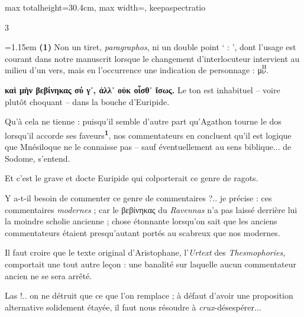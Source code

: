 \documentclass[11pt,twoside]{book}
\newcommand{\italique}[1]{\textit{#1}}
\newcommand{\auDessus}[2]{$\overset{\text{#2}}{\text{#1}}$}
\newcommand{\latin}[1]{\textit{#1}}
\newcommand{\allemand}[1]{\textit{#1}}
\newcommand{\marqueur}[1]{\textsuperscript{\color{rubricRed}\textbf{#1}}}
\begin{document}
\begin{adjustbox}{max totalheight=30.4cm, max width=\textwidth, keepaspectratio}
\begin{minipage}{\textwidth}
{\begin{multicols}{3}
\par\vspace{1.5pt}
\par\vspace{1.2pt}\par\nopagebreak\vspace{1pt}\noindent\hangindent=1.15em {\color{sepiaNote}\textbf{(1)}} Non un tiret, \italique{paragraphos}, ni un double point ` : ', dont l'usage est courant dans notre manuscrit lorsque le changement d'interlocuteur intervient au milieu d'un vers, mais en l'occurrence une indication de personnage : μ\auDessus{ν}{Η}.
\par\vspace{1.5pt}
 \textbf{καὶ μὴν βεβίνηκας σύ γ᾽, ἀλλ᾽ οὐκ οἶσθ᾽ ἴσως.} Le ton est inhabituel -- voire plutôt choquant -- dans la bouche d'Euripide.
\par\vspace{1.5pt}
\noindent Qu'à cela ne tienne : puisqu'il semble d'autre part qu'Agathon tourne le dos lorsqu'il accorde ses faveurs\marqueur{1}, nos commentateurs en concluent qu'il est logique que Mnésiloque ne le connaisse pas -- sauf éventuellement au sens biblique... de Sodome, s'entend.
\par\vspace{1.5pt}
\noindent Et c'est le grave et docte Euripide qui colporterait ce genre de ragots.
\par\vspace{1.5pt}
\noindent Y a-t-il besoin de commenter ce genre de commentaires ?.. je précise : ces commentaires \italique{modernes} ; car le βεβίνηκας du \italique{Ravennas} n'a pas laissé derrière lui la moindre scholie ancienne ; chose étonnante lorsqu'on sait que les anciens commentateurs étaient presqu'autant portés au scabreux que nos modernes.
\par\vspace{1.5pt}
\noindent Il faut croire que le texte original d'Aristophane, l'\allemand{Urtext} des \italique{Thesmophories}, comportait une tout autre leçon : une banalité sur laquelle aucun commentateur ancien ne se sera arrêté.
\par\vspace{1.5pt}
\noindent Las !.. on ne détruit que ce que l'on remplace ; à défaut d'avoir une proposition alternative solidement étayée, il faut nous résoudre à \latin{crux}-désespérer...
\par\vspace{1.5pt}

\end{multicols}}
\end{minipage}
\end{adjustbox}
\end{document}
